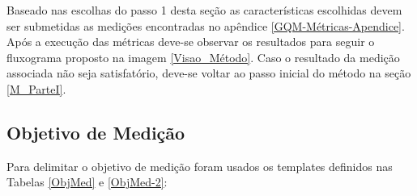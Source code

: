 Baseado nas escolhas do passo 1 desta seção as características escolhidas devem ser submetidas as medições encontradas no apêndice \ref{GQM-Métricas-Apendice}. 
Após a execução das métricas deve-se observar os resultados para seguir o fluxograma proposto na imagem \ref{Visao_Método}. Caso o resultado da medição associada não seja satisfatório, deve-se voltar ao passo inicial do método na seção \ref{M_ParteI}.
%
%
%
%
%
%
%
%

\subsection{Objetivo de Medição}

Para delimitar o objetivo de medição foram usados os templates definidos nas Tabelas \ref{ObjMed} e \ref{ObjMed-2}:


